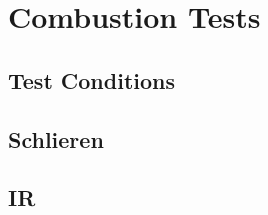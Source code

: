 
\section{Combustion Tests}


\subsection{Test Conditions}




\subsection{Schlieren}


\subsection{IR}


